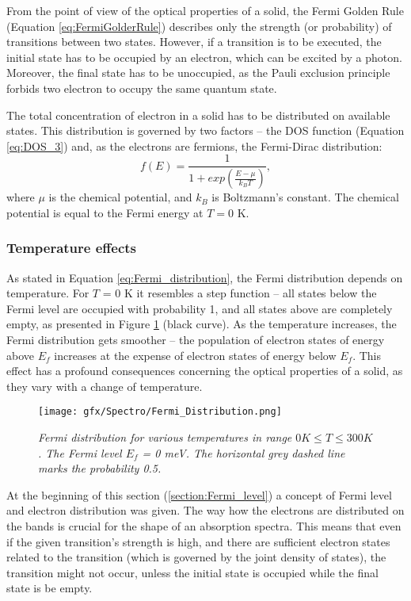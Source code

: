 \documentclass[titlepage,a4paper]{book}
\newcommand{\wciecie}{\quad\phantom{v}}
\begin{document}
From the point of view of the optical properties of a solid, the Fermi Golden Rule (Equation \ref{eq:FermiGolderRule}) describes only the strength (or probability) of transitions between two states. However, if a transition is to be executed, the initial state has to be occupied by an electron, which can be excited by a photon. Moreover, the final state has to be unoccupied, as the Pauli exclusion principle forbids two electron to occupy the same quantum state. 

The total concentration of electron in a solid has to be distributed on available states. This distribution is governed by two factors -- the DOS function (Equation \ref{eq:DOS_3}) and, as the electrons are fermions, the Fermi-Dirac distribution:
\begin{equation}
\label{eq:Fermi_distribution}
f(E) = \frac{1}{1+exp\left(\frac{E-\mu}{k_B T}\right)},
\end{equation}
where $\mu$ is the chemical potential, and $k_B$ is Boltzmann's constant. The chemical potential is equal to the Fermi energy at $T = 0$ K.

\subsubsection{Temperature effects}
\wciecie
As stated in Equation \ref{eq:Fermi_distribution}, the Fermi distribution depends on temperature. For $T$ = 0 K it resembles a step function -- all states below the Fermi level are occupied with probability 1, and all states above are completely empty, as presented in Figure \ref{fig:Fermi_Distribution} (black curve). As the temperature increases, the Fermi distribution gets smoother -- the population of electron states of energy above $E_f$ increases at the expense of electron states of energy below $E_f$. This effect has a profound consequences concerning the optical properties of a solid, as they vary with a change of temperature.

\begin{figure}[ht]
	\centering
	\texttt{[image: gfx/Spectro/Fermi\_Distribution.png]}
	\vspace{-10pt}
	\caption{\textit{Fermi distribution for various temperatures in range $0 K \leq T \leq 300 K$. The Fermi level $E_f$ = 0 meV. The horizontal grey dashed line marks the probability 0.5.}}
	\label{fig:Fermi_Distribution}
\end{figure}

At the beginning of this section (\ref{section:Fermi_level}) a concept of Fermi level and electron distribution was given. The way how the electrons are distributed on the bands is crucial for the shape of an absorption spectra. This means that even if the given transition's strength is high, and there are sufficient electron states related to the transition (which is governed by the joint density of states), the transition might not occur, unless the initial state is occupied while the final state is be empty. 
\end{document}
